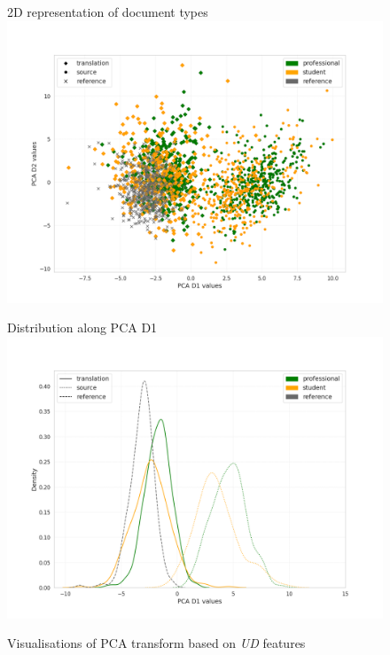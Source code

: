 \begin{figure}[H]
	\begin{minipage}[c]{0.5\linewidth}
		\centering
		2D representation of document types
		\includegraphics[width=\linewidth]{figures/pca/src-var-ttype-ud-PCA-scatter}
	\end{minipage}	
	\begin{minipage}[c]{0.5\linewidth}
		\centering
		Distribution along PCA D1
		\includegraphics[width=\linewidth]{figures/pca/src-var-ttype-ud-PCA-D1-lines}
	\end{minipage}
	\caption{\label{fig:vars-ud}Visualisations of PCA transform based on \textit{UD} features}	
\end{figure}
  
